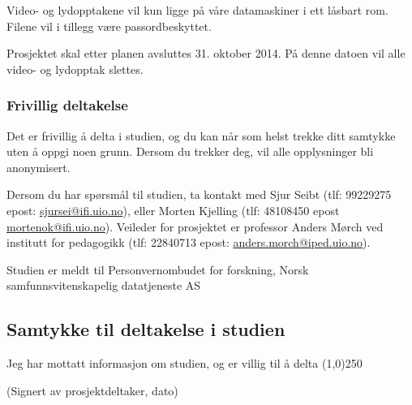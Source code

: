 Video- og lydopptakene vil kun ligge på våre datamaskiner i ett låsbart rom. Filene vil i tillegg være passordbeskyttet. 

Prosjektet skal etter planen avsluttes 31. oktober 2014. På denne datoen vil alle video- og lydopptak slettes. 

\subsubsection*{Frivillig deltakelse}
Det er frivillig å delta i studien, og du kan når som helst trekke ditt samtykke uten å oppgi noen grunn. Dersom du trekker deg, vil alle opplysninger bli anonymisert. 

Dersom du har spørsmål til studien, ta kontakt med Sjur Seibt (tlf: 99229275 epost: \href{mailto:sjursei@ifi.uio.no}{sjursei@ifi.uio.no}), eller Morten Kjelling (tlf: 48108450 epost \href{mailto:mortenok@ifi.uio.no}{mortenok@ifi.uio.no}). Veileder for prosjektet er professor Anders Mørch ved institutt for pedagogikk (tlf: 22840713 epost: \href{mailto:anders.morch@iped.uio.no}{anders.morch@iped.uio.no}). 

Studien er meldt til Personvernombudet for forskning, Norsk samfunnsvitenskapelig datatjeneste AS

\subsection*{Samtykke til deltakelse i studien}
Jeg har mottatt informasjon om studien, og er villig til å delta
\newline\newline\newline\newline
\line(1,0){250}

(Signert av prosjektdeltaker, dato)
%
\newpage
